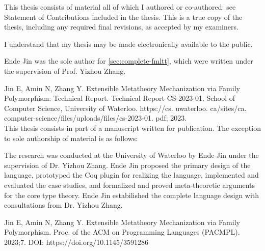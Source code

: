 





\newpage
{}
\setcounter{page}{2}

\vspace*{\fill}


This thesis consists of material all of which I authored or co-authored: see Statement of Contributions included in the thesis. This is a true copy of the thesis, including any required final revisions, as accepted by my examiners.

I understand that my thesis may be made electronically available to the public.

\vspace*{\fill}

\newpage 


\vspace*{\fill}




Ende Jin was the sole author for \cref{sec:complete-fmltt}, which were written under the supervision of Prof. Yizhou Zhang.


Jin E, Amin N, Zhang Y. Extensible Metatheory Mechanization via Family Polymorphism: Technical Report. Technical Report CS-2023-01. School of Computer Science, University of Waterloo. https://cs. uwaterloo. ca/sites/ca. computer-science/files/uploads/files/cs-2023-01. pdf; 2023. \\


This thesis consists in part of a manuscript written for publication. The exception to sole authorship of material is as follows: 

The research was conducted at the University of Waterloo by Ende Jin under the supervision of Dr. Yizhou Zhang. Ende Jin proposed the primary design of the language, prototyped the Coq plugin for realizing the language, implemented and evaluated the case studies, and formalized and proved meta-theoretic arguments for the core type theory. Ende Jin estabilished the complete language design with consultations from Dr. Yizhou Zhang.


Jin E, Amin N, Zhang Y. Extensible Metatheory Mechanization via Family Polymorphism. Proc. of the ACM on Programming Languages (PACMPL). 2023;7. DOI: https://doi.org/10.1145/3591286


